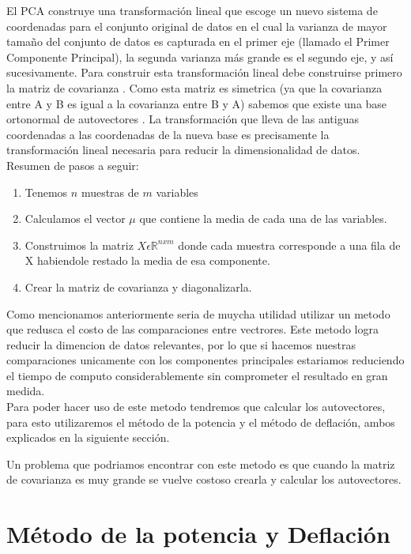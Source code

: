 El PCA construye una transformación lineal que escoge un nuevo sistema de coordenadas para el conjunto original de datos en el cual la varianza de mayor tamaño del conjunto de datos es capturada en el primer eje (llamado el Primer Componente Principal), la segunda varianza más grande es el segundo eje, y así sucesivamente. Para construir esta transformación lineal debe construirse primero la matriz de covarianza . Como esta matriz es simetrica (ya que la covarianza entre A y B es igual a la covarianza entre B y A) sabemos que existe una base ortonormal de autovectores . La transformación que lleva de las antiguas coordenadas a las coordenadas de la nueva base es precisamente la transformación lineal necesaria para reducir la dimensionalidad de datos. \\

Resumen de pasos a seguir:
\begin{enumerate}
\item Tenemos $n$ muestras de $m$ variables
\item Calculamos el vector $\mu$ que contiene la media de cada una de las variables.
\item Construimos la matriz $X \epsilon \mathbb{R}^{nxm}$ donde cada muestra corresponde a una fila de X habiendole restado la media de esa componente.
\item Crear la matriz de covarianza y diagonalizarla.
\end{enumerate}

Como mencionamos anteriormente seria de muycha utilidad utilizar un metodo que redusca el costo de las comparaciones entre vectrores. Este metodo logra reducir la dimencion de datos relevantes, por lo que si hacemos nuestras comparaciones unicamente con los componentes principales estariamos reduciendo el tiempo de computo considerablemente sin comprometer el resultado en gran medida. \\

Para poder hacer uso de este metodo tendremos que calcular los autovectores, para esto utilizaremos el método de la potencia y el método de deflación, ambos explicados en la siguiente sección.

Un problema que podriamos encontrar con este metodo es que cuando la matriz de covarianza es muy grande se vuelve costoso crearla y calcular los autovectores.




\section{Método de la potencia y Deflación}

